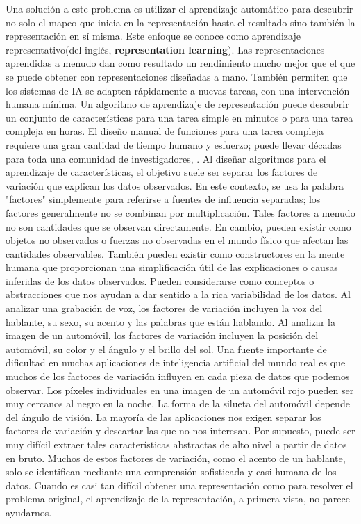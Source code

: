 	\vskip 0.4cm 
	Una solución a este problema es utilizar el aprendizaje automático para descubrir no solo el mapeo que inicia en la representación hasta el resultado sino también la representación en sí misma. Este enfoque se conoce como aprendizaje representativo(del inglés, {\bf representation learning}). Las representaciones aprendidas a menudo dan como resultado un rendimiento mucho mejor que el que se puede obtener con representaciones diseñadas a mano. También permiten que los sistemas de IA se adapten rápidamente a nuevas tareas, con una intervención humana mínima. Un algoritmo de aprendizaje de representación puede descubrir un conjunto de características para una tarea simple en minutos o para una tarea compleja en horas. El diseño manual de funciones para una tarea compleja requiere una gran cantidad de tiempo humano y esfuerzo; puede llevar décadas para toda una comunidad de investigadores, \citep{Goodfellow-et-al-2016}.
	\vskip 0.4cm 
	Al diseñar algoritmos para el aprendizaje de características, el objetivo suele ser separar los factores de variación que explican los datos observados. En este contexto, se usa la palabra "factores" simplemente para referirse a fuentes de influencia separadas; los factores generalmente no se combinan por multiplicación. Tales factores a menudo no son cantidades que se observan directamente. En cambio, pueden existir como objetos no observados o fuerzas no observadas en el mundo físico que afectan las cantidades observables. También pueden existir como constructores en la mente humana que proporcionan una simplificación útil de las explicaciones o causas inferidas de los datos observados. Pueden considerarse como conceptos o abstracciones que nos ayudan a dar sentido a la rica variabilidad de los datos. Al analizar una grabación de voz, los factores de variación incluyen la voz del hablante, su sexo, su acento y las palabras que están hablando. Al analizar la imagen de un automóvil, los factores de variación incluyen la posición del automóvil, su color y el ángulo y el brillo del sol.
	\vskip 0.4cm 
	Una fuente importante de dificultad en muchas aplicaciones de inteligencia artificial del mundo real es que muchos de los factores de variación influyen en cada pieza de datos que podemos observar. Los píxeles individuales en una imagen de un automóvil rojo pueden ser muy cercanos al negro en la noche. La forma de la silueta del automóvil depende del ángulo de visión. La mayoría de las aplicaciones nos exigen separar los factores de variación y descartar las que no nos interesan. Por supuesto, puede ser muy difícil extraer tales características abstractas de alto nivel a partir de datos en bruto. Muchos de estos factores de variación, como el acento de un hablante, solo se identifican mediante una comprensión sofisticada y casi humana de los datos. Cuando es casi tan difícil obtener una representación como para resolver el problema original, el aprendizaje de la representación, a primera vista, no parece ayudarnos.
